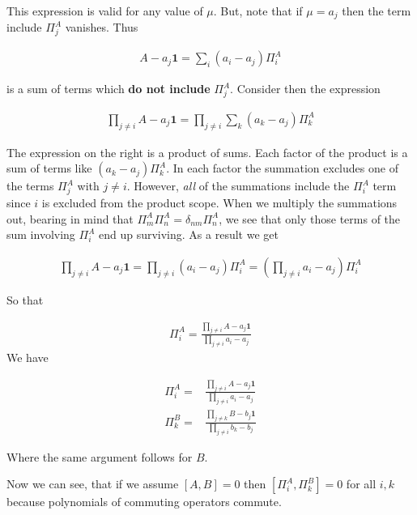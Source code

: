 \documentclass[12pt]{article}
\newcommand{\bv}[1]{\boldsymbol{#1}}
\begin{document}
This expression is valid for any value of $\mu$.
But, note that if $\mu = a_j$ then the term include $\Pi^A_j$ vanishes.
Thus

\begin{align}
A - a_j \bv{1} = \sum_i (a_i - a_j) \Pi^A_i
\end{align}

is a sum of terms which \textbf{do not include} $\Pi^A_j$.
Consider then the expression

\begin{align}
\prod_{j \neq i} A- a_j \bv{1} = \prod_{j \neq i} \sum_k (a_k - a_j) \Pi^A_k
\end{align}

The expression on the right is a product of sums.
Each factor of the product is a sum of terms like $(a_k - a_j)\Pi^A_k$.
In each factor the summation excludes one of the terms $\Pi^A_j$ with $j\neq i$.
However, \textit{all} of the summations include the $\Pi^A_i$ term since $i$ is excluded from the product scope.
When we multiply the summations out, bearing in mind that $\Pi^A_m\Pi^A_n = \delta_{nm}\Pi^A_n$, we see that only those terms of the sum involving $\Pi^A_i$ end up surviving.
As a result we get

\begin{align}
\prod_{j\neq i} A- a_j \bv{1} = \prod_{j\neq i} (a_i - a_j)\Pi^A_i = \left(\prod_{j\neq i} a_i - a_j\right)\Pi^A_i
\end{align}

So that

\begin{align}
\Pi^A_i = \frac{\prod_{j \neq i} A - a_j \bv{1}}{\prod_{j\neq i} a_i - a_j}
\end{align}
We have

\begin{align}
\Pi^A_i =& \frac{\prod_{j\neq i} A - a_j \bv{1}}{\prod_{j\neq i} a_i-a_j} \nonumber\\
\Pi^B_k =& \frac{\prod_{j\neq k} B - b_j \bv{1}}{\prod_{j\neq i} b_k-b_j}
\end{align}

Where the same argument follows for $B$.

Now we can see, that if we assume $[A, B] = 0$ then $[\Pi_i^A, \Pi_k^B] = 0$ for all $i, k$ because polynomials of commuting operators commute.
\end{document}
